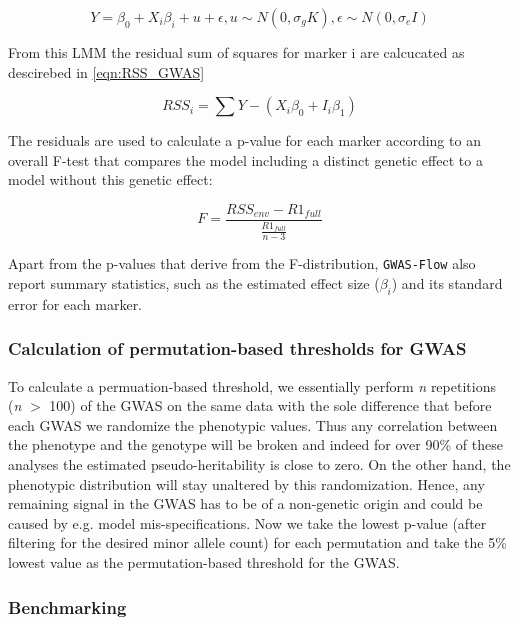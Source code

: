 \begin{equation}
Y = \beta_{0} + X_i\beta_i + u + \epsilon, u \sim N(0,\sigma_gK), \epsilon \sim N(0,\sigma_e I )
\label{eqn:LMM GWAS}
\end{equation}

\noindent
From this LMM the residual sum of squares for marker i are calcucated as descirebed in \ref{eqn:RSS_GWAS}


\begin{equation}
RSS_{i} = \sum{Y - (X_{i}\beta_{0}  + I_{i}\beta_{1})}
\label{eqn:RSS_GWAS}
\end{equation}

\noindent
The residuals are used to calculate a p-value for each marker according to an overall F-test that compares the
model including a distinct genetic effect to a model without this genetic effect:

\begin{equation}
 F = \frac{RSS_{env} - R1_{full} }{\frac{R1_{full}}{n-3}}
 \label{F_test}
\end{equation}

\noindent
Apart from the p-values that derive from the F-distribution, \texttt{GWAS-Flow} also report summary statistics, such as the estimated
effect size ($\beta_i$) and its standard error for each marker.
\subsubsection{Calculation of permutation-based thresholds for GWAS}

To calculate a permuation-based threshold, we essentially perform \textit{n} repetitions (\textit{n} $>$ 100)
of the GWAS on the same data with the sole difference that before each GWAS we randomize the phenotypic
values. Thus any correlation between the phenotype and the genotype will be broken and indeed for over 90\% of
these analyses the estimated pseudo-heritability is close to zero. On the other hand, the phenotypic
distribution will stay unaltered by this randomization. Hence, any remaining signal in the GWAS has to be of a
non-genetic origin and could be caused by e.g. model mis-specifications. Now we take the lowest p-value (after
filtering for the desired minor allele count) for each permutation and take the 5\% lowest value as the
permutation-based threshold for the GWAS.

\subsubsection{Benchmarking}

